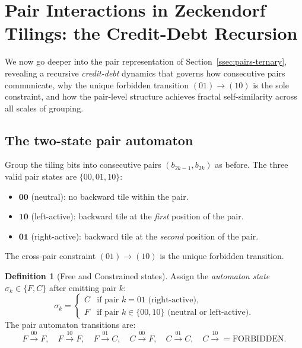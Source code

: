\documentclass[12pt,reqno]{amsart}
\theoremstyle{definition}
\newtheorem{definition}[theorem]{Definition}
\theoremstyle{plain}
\begin{document}
\section{Pair Interactions in Zeckendorf Tilings: the Credit-Debt Recursion}
\label{sec:pair-recursion}

We now go deeper into the pair representation of Section~\ref{ssec:pairs-ternary},
revealing a recursive \emph{credit-debt} dynamics that governs how consecutive
pairs communicate, why the unique forbidden transition $(01)\to(10)$ is
the sole constraint, and how the pair-level structure achieves fractal
self-similarity across all scales of grouping.

\subsection{The two-state pair automaton}
\label{ssec:pair-automaton}

Group the tiling bits into consecutive pairs $(b_{2k-1},b_{2k})$ as before.
The three valid pair states are $\{00,01,10\}$:
\begin{itemize}
\item $\mathbf{00}$ (neutral): no backward tile within the pair.
\item $\mathbf{10}$ (left-active): backward tile at the \emph{first} position of the pair.
\item $\mathbf{01}$ (right-active): backward tile at the \emph{second} position of the pair.
\end{itemize}

The cross-pair constraint $(01)\to(10)$ is the unique forbidden transition.

\begin{definition}[Free and Constrained states]
Assign the \emph{automaton state} $\sigma_k\in\{F,C\}$ after emitting pair $k$:
\[
  \sigma_k=\begin{cases}C & \text{if pair }k=01\text{ (right-active)},\\
                         F & \text{if pair }k\in\{00,10\}\text{ (neutral or left-active)}.\end{cases}
\]
The pair automaton transitions are:
\[
  F\xrightarrow{00}F,\quad F\xrightarrow{10}F,\quad F\xrightarrow{01}C,
  \quad C\xrightarrow{00}F,\quad C\xrightarrow{01}C,\quad C\xrightarrow{10}=\text{FORBIDDEN}.
\]
\end{definition}
\end{document}
